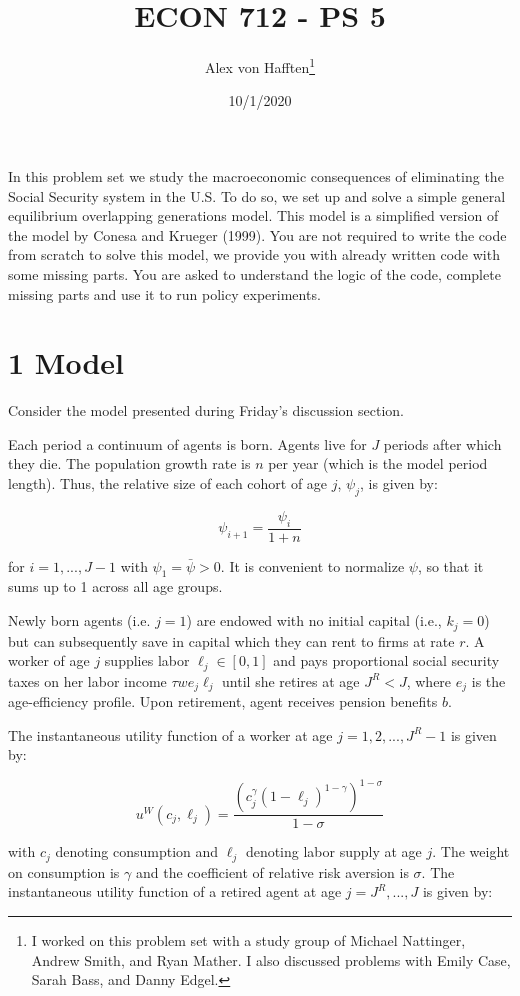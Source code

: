 \documentclass[]{article}
\title{ECON 712 - PS 5}
\author{Alex von Hafften\footnote{I worked on this problem set with a study
  group of Michael Nattinger, Andrew Smith, and Ryan Mather. I also
  discussed problems with Emily Case, Sarah Bass, and Danny Edgel.}}
\date{10/1/2020}
\begin{document}
\maketitle

In this problem set we study the macroeconomic consequences of
eliminating the Social Security system in the U.S. To do so, we set up
and solve a simple general equilibrium overlapping generations model.
This model is a simplified version of the model by Conesa and Krueger
(1999). You are not required to write the code from scratch to solve
this model, we provide you with already written code with some missing
parts. You are asked to understand the logic of the code, complete
missing parts and use it to run policy experiments.

\section{1 Model}\label{model}

Consider the model presented during Friday's discussion section.

Each period a continuum of agents is born. Agents live for \(J\) periods
after which they die. The population growth rate is \(n\) per year
(which is the model period length). Thus, the relative size of each
cohort of age \(j\), \(\psi_j\), is given by:

\[\psi_{i+1} = \frac{\psi_i}{1+n}\]

for \(i=1, ..., J - 1\) with \(\psi_1 = \bar{\psi} > 0\). It is
convenient to normalize \(\psi\), so that it sums up to 1 across all age
groups.

Newly born agents (i.e. \(j=1\)) are endowed with no initial capital
(i.e., \(k_j=0\)) but can subsequently save in capital which they can
rent to firms at rate \(r\). A worker of age \(j\) supplies labor
\(\ell_j \in [0,1]\) and pays proportional social security taxes on her
labor income \(\tau w e_j \ell_j\) until she retires at age \(J^R < J\),
where \(e_j\) is the age-efficiency profile. Upon retirement, agent
receives pension benefits \(b\).

The instantaneous utility function of a worker at age
\(j=1, 2, ..., J^R-1\) is given by:

\[u^{W} (c_j, \ell_j) = \frac{(c_j^{\gamma}(1-\ell_j)^{1-\gamma})^{1-\sigma}}{1 - \sigma}\]

with \(c_j\) denoting consumption and \(\ell_j\) denoting labor supply
at age \(j\). The weight on consumption is \(\gamma\) and the
coefficient of relative risk aversion is \(\sigma\). The instantaneous
utility function of a retired agent at age \(j = J^R, ..., J\) is given
by:
\end{document}
